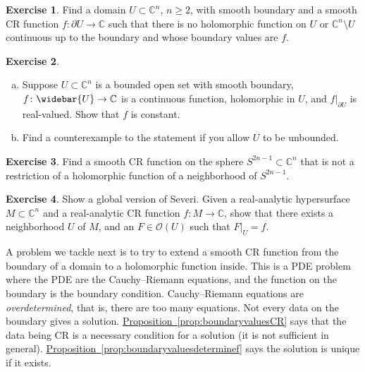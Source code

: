\documentclass[12pt,openany]{book}
\newcommand{\C}{{\mathbb{C}}}
\newcommand{\sO}{{\mathscr{O}}}
\newcommand{\myindex}[1]{#1\index{#1}}
\theoremstyle{plain}
\theoremstyle{remark}
\theoremstyle{definition}
\newenvironment{exbox}{%
    \def\FrameCommand{\vrule width 1pt \relax\hspace{10pt}}%
    \MakeFramed {\advance \hsize -\width \FrameRestore}%
}{%
    \endMakeFramed
}
\newenvironment{exparts}{%
    \leavevmode\begin{enumerate}[a),noitemsep,topsep=0pt,parsep=0pt,partopsep=0pt]
}{%
    \end{enumerate}
}
\theoremstyle{exercise}
\newtheorem{exercise}{Exercise}[section]
\theoremstyle{example}
\newcommand{\propref}[1]{\hyperref[#1]{Proposition~\ref*{#1}}}
\begin{document}
\begin{exbox}
\begin{exercise}
Find a domain $U \subset \C^n$, $n \geq 2$, with smooth boundary and a smooth
CR function $f \colon \partial U \to \C$ such that there is no holomorphic function
on $U$ or $\C^n \setminus U$ continuous up to the boundary and whose boundary values are $f$.
\end{exercise}

\begin{exercise}
\begin{exparts}
\item
Suppose $U \subset \C^n$ is a bounded open set with smooth boundary,
$f \colon \widebar{U} \to \C$ is a continuous function, holomorphic in
$U$, and $f|_{\partial U}$ is real-valued.  Show that $f$ is
constant.
\item
Find a counterexample to the statement if you allow $U$
to be unbounded.
\end{exparts}
\end{exercise}

\begin{exercise}
Find a smooth CR function on the sphere $S^{2n-1} \subset \C^n$ that is not
a restriction of a holomorphic function of a neighborhood of $S^{2n-1}$.
\end{exercise}

\begin{exercise}
Show a global version of Severi.  Given a real-analytic hypersurface $M
\subset \C^n$ and a real-analytic CR function $f \colon M \to \C$,
show that there exists a neighborhood $U$ of $M$, and an $F \in \sO(U)$
such that $F|_U = f$.
\end{exercise}
\end{exbox}

A problem we tackle next is to try to extend
a smooth CR function from the boundary of a domain to a holomorphic
function inside.  This is a PDE problem where the PDE are
the Cauchy--Riemann equations, and the function on the boundary is
the boundary condition.
Cauchy--Riemann equations are
\emph{\myindex{overdetermined}}, that is, there are too many
equations.  Not every data on the boundary gives a solution.
\propref{prop:boundaryvaluesCR} says that the data being CR is a necessary condition
for a solution (it is not sufficient in general).
\propref{prop:boundaryvaluesdeterminef} says the solution is unique
if it exists.

\end{document}
